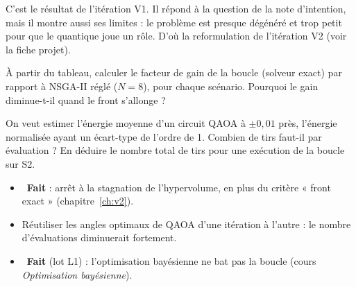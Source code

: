 \begin{projet}
C'est le résultat de l'itération V1. Il répond à la question de la note d'intention, mais il montre aussi ses limites : le problème est presque dégénéré et trop petit pour que le quantique joue un rôle. D'où la reformulation de l'itération V2 (voir la fiche projet).
\end{projet}

\exercices
\begin{exercice}
À partir du tableau, calculer le facteur de gain de la boucle (solveur exact) par rapport à NSGA-II réglé ($N=8$), pour chaque scénario. Pourquoi le gain diminue-t-il quand le front s'allonge ?
\end{exercice}
\begin{exercice}
On veut estimer l'énergie moyenne d'un circuit QAOA à $\pm0{,}01$ près, l'énergie normalisée ayant un écart-type de l'ordre de 1. Combien de tirs faut-il par évaluation ? En déduire le nombre total de tirs pour une exécution de la boucle sur S2.
\end{exercice}

\begin{pistes}
\begin{itemize}
\item {}~\textbf{Fait} : arrêt à la stagnation de l'hypervolume, en plus du critère « front exact » (chapitre~\ref{ch:v2}).
\item Réutiliser les angles optimaux de QAOA d'une itération à l'autre : le nombre d'évaluations diminuerait fortement.
\item {}~\textbf{Fait} (lot L1) : l'optimisation bayésienne ne bat pas la boucle (cours \emph{Optimisation bayésienne}).
\end{itemize}
\end{pistes}
